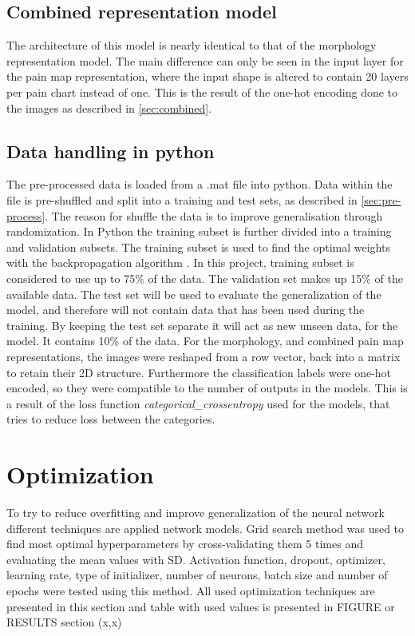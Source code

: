 \subsection{Combined representation model}
The architecture of this model is nearly identical to that of the morphology representation model.
The main difference can only be seen in the input layer for the pain map representation, where the input shape is altered to contain 20 layers per pain chart instead of one. This is the result of the one-hot encoding done to the images as described in \ref{sec:combined}. 

\subsection{Data handling in python}
The pre-processed data is loaded from a %
.mat file into python.
Data within the file is pre-shuffled and split into a training and test sets, as described in \autoref{sec:pre-process}. The reason for shuffle the data is to improve generalisation through randomization.
In Python the training subset is further divided into a training and validation subsets. 
The training subset is used to find the optimal weights with the backpropagation algorithm \citep{Bengio2012}. In this project, training subset is considered to use up to 75\% of the data. The validation set makes up 15\% of the available data.
The test set will be used to evaluate the generalization of the model, and therefore will not contain data that has been used during the training. By keeping the test set separate it will act as new unseen data, for the model. It contains 10\% of the data.
For the morphology, and combined pain map representations, the images were reshaped from a row vector, back into a matrix to retain their 2D structure.
Furthermore the classification labels were one-hot encoded, so they were compatible to the number of outputs in the models. This is a result of the loss function \textit{categorical\_crossentropy} used for the models, that tries to reduce loss between the categories.    

\section{Optimization}
To try to reduce overfitting and improve generalization of the neural network different techniques are applied network models. Grid search method was used to find most optimal hyperparameters by cross-validating them 5 times and evaluating the mean values with SD. Activation function, dropout, optimizer, learning rate, type of initializer, number of neurons, batch size and number of epochs were tested using this method.  All used optimization techniques are presented in this section and table with used values is presented in FIGURE or RESULTS section (x,x)

